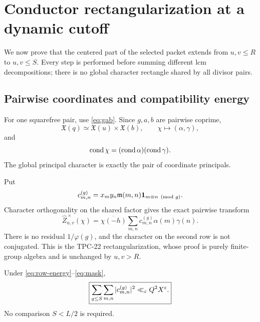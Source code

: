 \section{Conductor rectangularization at a dynamic cutoff}
\label{sec:dynamic-conductor}

We now prove that the centered part of the selected packet extends
from \(u,v\le R\) to \(u,v\le S\).  Every step is performed before
summing different lcm decompositions; there is no global character
rectangle shared by all divisor pairs.

\subsection{Pairwise coordinates and compatibility energy}

For one squarefree pair, use \eqref{eq:gab}.  Since \(g,a,b\) are
pairwise coprime,
\begin{equation}
 \mathfrak X(q)\simeq\mathfrak X(u)\times\mathfrak X(b),
 \qquad \chi\longmapsto(\alpha,\gamma),
 \label{eq:product-characters}
\end{equation}
and
\begin{equation}
 \operatorname{cond}\chi=(\operatorname{cond}\alpha)(\operatorname{cond}\gamma).
 \label{eq:product-conductors}
\end{equation}
The global principal character is exactly the pair of coordinate
principals.

Put
\begin{equation}
 c_{m,n}^{(g)}
 =x_my_n\mathfrak m(m,n)\mathbf 1_{m\equiv n\pmod g}.
 \label{eq:compatibility-matrix}
\end{equation}
Character orthogonality on the shared factor gives the exact pairwise
transform
\begin{equation}
 \widehat Z_{u,v}^{\,\times}(\chi)
 =\overline{\chi(-h)}
 \sum_{m,n}c_{m,n}^{(g)}\alpha(m)\gamma(n).
 \label{eq:pair-rectangularization}
\end{equation}
There is no residual \(1/\varphi(g)\), and the character on the second
row is not conjugated.  This is the TPC-22 rectangularization, whose
proof is purely finite-group algebra and is unchanged by \(u,v>R\).

\begin{proposition}
\label{prop:compatibility-energy}
Under \eqref{eq:row-energy}--\eqref{eq:mask},
\begin{equation}
 \boxed{
 \sum_{g\le S}\sum_{m,n}|c_{m,n}^{(g)}|^2
 \ll_\varepsilon Q^2X^\varepsilon.}
 \label{eq:compatibility-energy}
\end{equation}
No comparison \(S<L/2\) is required.
\end{proposition}

